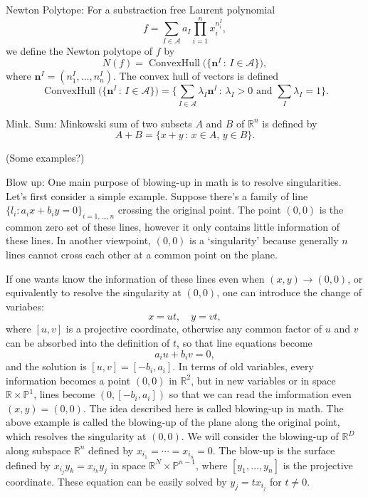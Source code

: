 \documentclass[12pt]{article}
\theoremstyle{definition}
\theoremstyle{plain}
\begin{document}
Newton Polytope: For a substraction free Laurent polynomial 
\[
	f = \sum_{I\in \mathscr A} a_I \prod_{i=1}^n x_i^{n^I_i},
\]
we define the Newton polytope of $f$ by
\[
	N(f)=\operatorname{ConvexHull}\bigl(\{\mathbf n^I\,:\, I\in \mathscr A\}\bigr),
\]
where $\mathbf n^I=(n^I_1,\dots,n^I_n)$. The convex hull of vectors is defined
\[
	\operatorname{ConvexHull}\bigl(\{\mathbf n^I\,:\, I\in \mathscr A\}\bigr)
	=\Biggl\{\sum_{I\in\mathscr A}\lambda_I \mathbf n^I\,:\,
	\text{$\lambda_I>0$ and $\sum_I\lambda_I=1$}\Biggr\}.
\] 

Mink. Sum: Minkowski sum of two subsets $A$ and $B$ of $\mathbb R^n$ is defined by 
\[
	A+B=\{x+y\,:\,x\in A,\, y\in B\}.
\] 

(Some examples?)

Blow up: One main purpose of blowing-up in math is to resolve singularities. 
Let's first consider a simple example. 
Suppose there's a family of line $\{l_i: a_ix+b_iy=0\}_{i=1,\dots,n}$ crossing 
the original point. The point $(0,0)$ is the common zero set of these lines,
however it only contains little information of these lines. In another viewpoint,
$(0,0)$ is a `singularity' because generally $n$ lines cannot cross each other 
at a common point on the plane. 

If one wants know the information of these lines even when $(x,y)\to (0,0)$, 
or equivalently to resolve the singularity at $(0,0)$, one can introduce the 
change of variabes: 
\[
x=ut,\quad y=vt,
\] 
where $[u,v]$ is a projective coordinate, otherwise any common factor of $u$ and $v$ can be 
absorbed into the definition of $t$, so that line equations become 
\[
	a_i u + b_i v = 0,
\]
and the solution is $[u,v]=[-b_i,a_i]$. In terms of old variables, every information 
becomes a point $(0,0)$ in $\mathbb R^2$, but in new variables or in space 
$\mathbb R\times \mathbb P^1$, lines become $(0,[-b_i,a_i])$ so that we can read the imformation
even $(x,y)=(0,0)$. The idea described here is called blowing-up in math.  
The above example is called the blowing-up of the plane along the original point, which 
resolves the singularity at $(0,0)$. We will consider the blowing-up of $\mathbb R^D$
along subspace $\mathbb R^n$ defined by $x_{i_1}=\cdots=x_{i_n}=0$. 
The blow-up is the surface defined by $x_{i_j}y_k=x_{i_k}y_j$ in space $\mathbb R^{N}\times \mathbb P^{n-1}$,
where $[y_1,\dots,y_n]$ is the projective coordinate. These equation can be easily
solved by $y_j=tx_{i_j}$ for $t\neq 0$.
\end{document}
